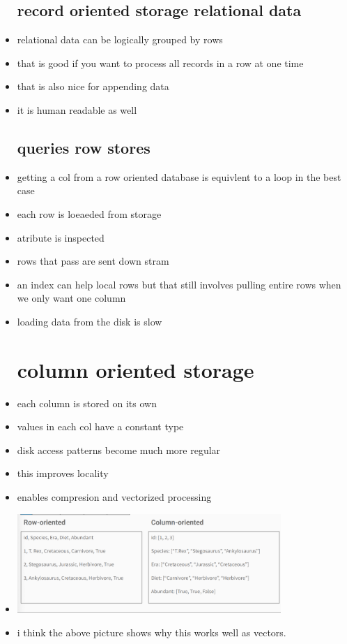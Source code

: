 \documentclass{article}
\begin{document}
\begin{itemize}
\subsection*{record oriented storage relational data}
\item relational data can be logically grouped by rows 
\item that is good if you want to process all records in a row at one time 
\item that is also nice for appending data 
\item it is human readable as well
\subsection*{queries row stores}
\item  getting a col from a row oriented database is equivlent to a loop in the best case
\item each row is loeaeded from storage 
\item atribute is inspected 
\item rows that pass are sent down stram 
\item an index can help local rows but that still involves pulling entire rows when we only want one column
\item loading data from the disk is slow
\section*{column oriented storage}
\item each column is stored on its own 
\item values in each col have a constant type 
\item disk access patterns become much more regular 
\item this improves locality
\item enables compresion and vectorized processing 
\item \includegraphics*[width=10cm]{images/Screenshot 2023-05-10 at 4.11.40 AM.png}
\item i think the above picture shows why this works well as vectors. 

\end{itemize}
\end{document}
